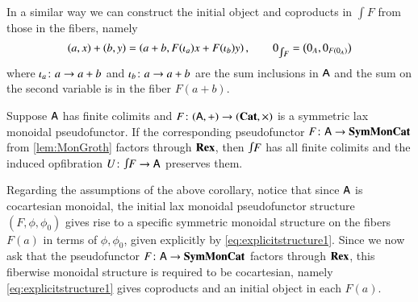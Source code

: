 \documentclass[reqno]{amsart}
\begin{document}
In a similar way we can construct the initial object and coproducts in $\int F$ from those in the fibers, namely
\begin{equation}\label{eq:fibrewisecoprod}
(a,x)+(b,y)=\left(a+ b,F(\iota_a)x+F(\iota_b)y\right), \qquad 
 0_{\inta F}=\left(0_A,0_{F(0_A)}\right)
\end{equation}
where $\iota_a \colon a\to a+b$ and $\iota_b \colon a \to a+b$ are the sum inclusions in $\mathsf{A}$ and the sum on the second variable is in the fiber $F(a+b)$.

\begin{cor}\label{cor:fcocMonGroth}
 Suppose $\mathsf{A}$ has finite colimits and $F \colon (\mathsf{A},+) \to (\mathbf{Cat},\times)$ is a symmetric lax monoidal pseudofunctor. If the corresponding pseudofunctor $F  \colon \mathsf{A} \to \mathbf{SymMonCat}$ from \cref{lem:MonGroth} factors through $\mathbf{Rex}$, then $\inta F$ has all finite colimits and the induced opfibration $U\maps \inta F \to \A$ preserves them.
\end{cor}

Regarding the assumptions of the above corollary, notice that since $\mathsf{A}$ is cocartesian monoidal, the initial lax monoidal pseudofunc\-tor structure $(F,\phi,\phi_0)$ gives rise to a specific symmetric monoidal structure on the fibers $F(a)$ in terms of $\phi,\phi_0$, given explicitly by \cref{eq:explicitstructure1}. Since we now ask that the pseudofunctor $F\colon \mathsf{A}\to\mathbf{SymMonCat}$ factors through $\mathbf{Rex}$, this fiberwise monoidal structure is required to be cocartesian, namely \cref{eq:explicitstructure1} gives coproducts and an initial object in each $F(a)$.

\end{document}
